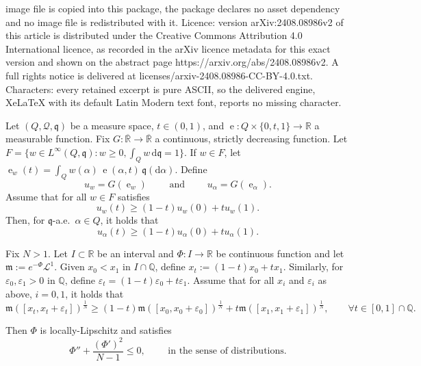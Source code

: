 \documentclass[10pt,a4paper]{amsart}
\DeclareMathOperator{\ee}{e}
\let\epsilon\varepsilon
\let\varepsilon\temp
\newcommand{\Q}{\mathbb{Q}}
\newcommand{\R}{\mathbb{R}}
\newcommand{\de}{{\mathrm{d}}}
\newcommand{\mm}{\mathfrak m}
\newcommand{\qq}{\mathfrak q}
\newcommand{\q}{\mathfrak{q}}
\renewcommand{\L}{\mathcal{L}}
\begin{document}
image file is copied into this package, the package declares no asset dependency and no image file is redistributed with it. Licence: version arXiv:2408.08986v2 of this article is distributed under the Creative Commons Attribution 4.0 International licence, as recorded in the arXiv licence metadata for this exact version and shown on the abstract page https://arxiv.org/abs/2408.08986v2. A full rights notice is delivered at licenses/arxiv-2408.08986-CC-BY-4.0.txt. Characters: every retained excerpt is pure ASCII, so the delivered engine, XeLaTeX with its default Latin Modern text font, reports no missing character.
\begin{lemma}
  \label{lem:mixture-riccati}
  Let $(Q, \mathcal{Q}, \qq)$ be a measure space, $t\in (0,1)$, and
  $\ee:Q\times \{0,t,1\}\to \R$ a measurable function.
  Fix $G:\overline{\R}\to\overline{\R}$ a continuous, strictly
  decreasing function.
  Let $F=\{w\in L^\infty(Q,\q): w\geq 0, \int_Q w\,\de\q=1\}$.
  If $w\in F$, let $\ee_w(t)=\int_Q w(\alpha)\,
  \ee(\alpha, t)\,\q(\de\alpha)$.
  Define
  \begin{equation}
    u_w= G(\ee_w)
    \qquad
    \text{ and }
    \qquad
    u_\alpha=
    G(\ee_\alpha)
    .
  \end{equation}
  Assume that for all
  $w\in F$ satisfies
  \begin{equation}
    u_w(t)
    \geq
    (1-t)
    u_w(0)
    +
    t
    u_w(1)    .
  \end{equation}
  Then, for $\q$-a.e.\ $\alpha\in Q$, it holds that
    \begin{equation}
    u_\alpha(t)
    \geq
    (1-t)
    u_\alpha(0)
    +
    t
    u_\alpha(1)    .
  \end{equation}  
\end{lemma}

\begin{lemma}
  \label{lem:brunn-minkowski-to-cd}
  Fix $N>1$.
  Let $I\subset \R$ be an interval and $\Phi:I\to \R$ be continuous
  function and let $\mm:=e^{-\Phi}\L^1$.
  Given $x_0 < x_1 $ in $I\cap \Q$, define $x_t:= (1-t)x_0 + t x_1$.
  Similarly, for $\epsilon_0,\epsilon_1>0$ in $\Q$, define
  $\epsilon_t=(1-t) \epsilon_0+t \epsilon_1$.
  Assume that for all $x_i$ and $\epsilon_i$ as above, $i=0,1$, it
  holds that
  \begin{equation}
    \mm([x_t,x_t+\epsilon_t])^{\frac{1}{N}}
    \geq
    (1-t)\mm([x_0,x_0+\epsilon_0])^{\frac{1}{N}}
    +
    t\mm([x_1,x_1+\epsilon_1])^{\frac{1}{N}}
    ,
    \qquad
    \forall t\in [0,1]
    \cap \Q
    .
  \end{equation}

  Then $\Phi$ is locally-Lipschitz and satisfies
  \begin{equation}
    \Phi''
    +
    \frac{(\Phi')^2}{N-1}
    \leq
    0
    ,
    \qquad
    \text{ in the sense of distributions}.
  \end{equation}
  \end{lemma}
\end{document}
